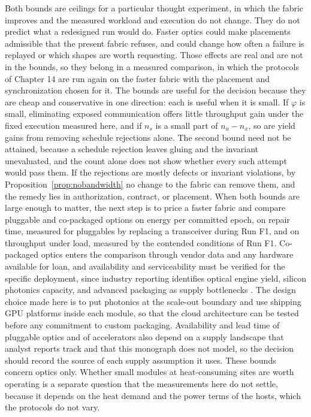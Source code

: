 \documentclass[11pt,openany]{book}
\theoremstyle{remark}
\begin{document}
Both bounds are ceilings for a particular thought experiment, in which the fabric improves and the measured workload and execution do not change. They do not predict what a redesigned run would do. Faster optics could make placements admissible that the present fabric refuses, and could change how often a failure is replayed or which shapes are worth requesting. Those effects are real and are not in the bounds, so they belong in a measured comparison, in which the protocols of Chapter 14 are run again on the faster fabric with the placement and synchronization chosen for it. The bounds are useful for the decision because they are cheap and conservative in one direction: each is useful when it is small. If $\varphi$ is small, eliminating exposed communication offers little throughput gain under the fixed execution measured here, and if $n_s$ is a small part of $n_a-n_x$, so are yield gains from removing schedule rejections alone. The second bound need not be attained, because a schedule rejection leaves gluing and the invariant unevaluated, and the count alone does not show whether every such attempt would pass them. If the rejections are mostly defects or invariant violations, by Proposition~\ref{prop:nobandwidth} no change to the fabric can remove them, and the remedy lies in authorization, contract, or placement. When both bounds are large enough to matter, the next step is to price a faster fabric and compare pluggable and co-packaged options on energy per committed epoch, on repair time, measured for pluggables by replacing a transceiver during Run F1, and on throughput under load, measured by the contended conditions of Run F1. Co-packaged optics enters the comparison through vendor data and any hardware available for loan, and availability and serviceability must be verified for the specific deployment, since industry reporting identifies optical engine yield, silicon photonics capacity, and advanced packaging as supply bottlenecks \cite{trendforce}. The design choice made here is to put photonics at the scale-out boundary and use shipping GPU platforms inside each module, so that the cloud architecture can be tested before any commitment to custom packaging. Availability and lead time of pluggable optics and of accelerators also depend on a supply landscape that analyst reports track \cite{lc} and that this monograph does not model, so the decision should record the source of each supply assumption it uses. These bounds concern optics only. Whether small modules at heat-consuming sites are worth operating is a separate question that the measurements here do not settle, because it depends on the heat demand and the power terms of the hosts, which the protocols do not vary.
\end{document}

